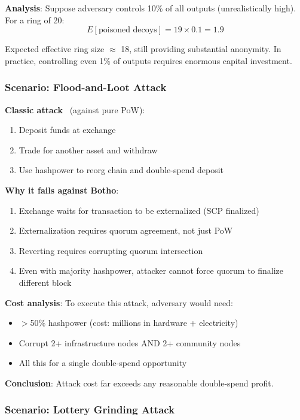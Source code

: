 \textbf{Analysis}: Suppose adversary controls 10\% of all outputs
(unrealistically high). For a ring of 20:
\[
E[\text{poisoned decoys}] = 19 \times 0.1 = 1.9
\]

Expected effective ring size $\approx$ 18, still providing substantial
anonymity. In practice, controlling even 1\% of outputs requires enormous
capital investment.

\subsubsection{Scenario: Flood-and-Loot Attack}

\textbf{Classic attack}~\cite{floodloot} (against pure PoW):
\begin{enumerate}
  \item Deposit funds at exchange
  \item Trade for another asset and withdraw
  \item Use hashpower to reorg chain and double-spend deposit
\end{enumerate}

\textbf{Why it fails against Botho}:

\begin{enumerate}
  \item Exchange waits for transaction to be externalized (SCP finalized)
  \item Externalization requires quorum agreement, not just PoW
  \item Reverting requires corrupting quorum intersection
  \item Even with majority hashpower, attacker cannot force quorum to
    finalize different block
\end{enumerate}

\textbf{Cost analysis}: To execute this attack, adversary would need:
\begin{itemize}
  \item $>$50\% hashpower (cost: millions in hardware + electricity)
  \item Corrupt 2+ infrastructure nodes AND 2+ community nodes
  \item All this for a single double-spend opportunity
\end{itemize}

\textbf{Conclusion}: Attack cost far exceeds any reasonable double-spend
profit.

\subsubsection{Scenario: Lottery Grinding Attack}

